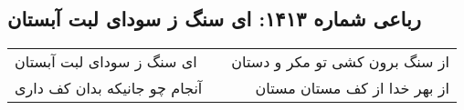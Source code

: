 \begin{center}
\section*{رباعی شماره ۱۴۱۳: ای سنگ ز سودای لبت آبستان}
\label{sec:1413}
\begin{longtable}{l p{0.5cm} r}
ای سنگ ز سودای لبت آبستان
&&
از سنگ برون کشی تو مکر و دستان
\\
آنجام چو جانیکه بدان کف داری
&&
از بهر خدا از کف مستان مستان
\\
\end{longtable}
\end{center}

